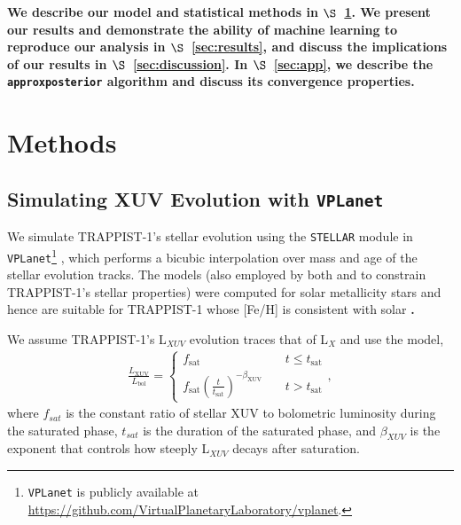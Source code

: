 \documentclass[twocolumn]{aastex62}
\newcommand{\xxx}[1]{{\textbf{#1}}}
\newcommand{\vplanet}[0]{\texttt{VPLanet}\xspace}
\newcommand{\approxposterior}[0]{\texttt{approxposterior}\xspace}
\newcommand{\stellar}[0]{\texttt{STELLAR}\xspace}
\begin{document}
\xxx{We describe our model and statistical methods in $\S$~\ref{sec:methods}. We present our results and demonstrate the ability of machine learning to reproduce our analysis in $\S$~\ref{sec:results}, and discuss the implications of our results in $\S$~\ref{sec:discussion}. In $\S$~\ref{sec:app}, we describe the \approxposterior algorithm and discuss its convergence properties.}

\section{Methods} \label{sec:methods}

\subsection{Simulating XUV Evolution with \vplanet} \label{sec:model}

We simulate TRAPPIST-1's stellar evolution using the \stellar module in \vplanet\footnote{\vplanet is publicly available at \href{https://github.com/VirtualPlanetaryLaboratory/vplanet}{https://github.com/VirtualPlanetaryLaboratory/vplanet}.} \citep{Barnes2019}, which performs a bicubic interpolation over mass and age of the \citet{Baraffe2015} stellar evolution tracks. The \citet{Baraffe2015} models (also employed by both \citet{Burgasser2017} and \citet{vanGrootel2018} to constrain TRAPPIST-1's stellar properties) were computed for solar metallicity stars and hence are suitable for TRAPPIST-1 whose [Fe/H] is consistent with solar \xxx{\citep[][see also \citet{Burgasser2017}]{Gillon2016}.}

We assume TRAPPIST-1's L$_{XUV}$ evolution traces that of L$_{X}$ and use the \citet{Ribas2005} model,
\begin{align}
\label{eqn:lxuv}
\frac{L_\mathrm{XUV}}{L_\mathrm{bol}} = \left\{
				\begin{array}{lcr}
					f_\mathrm{sat} &\ & t \leq t_\mathrm{sat} \\
					f_\mathrm{sat}\left(\frac{t}{t_\mathrm{sat}}\right)^{-\beta_\mathrm{XUV}} &\ & t > t_\mathrm{sat}
				\end{array}
				\right.,
\end{align}
where $f_{sat}$ is the constant ratio of stellar XUV to bolometric luminosity during the saturated phase, $t_{sat}$ is the duration of the saturated phase, and $\beta_{XUV}$ is the exponent that controls how steeply L$_{XUV}$ decays after saturation. 
\end{document}
